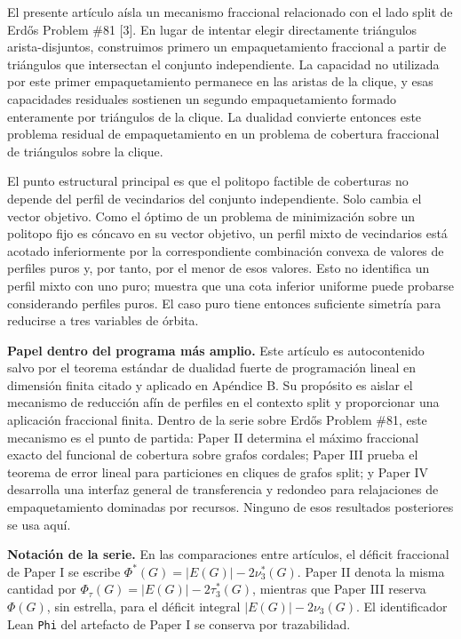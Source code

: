 \documentclass[
  spanish,
  11pt,
  a4paper,
]{article}
\begin{document}
El presente artículo aísla un mecanismo fraccional relacionado con el lado split de Erdős Problem \#81 {[}3{]}. En lugar de intentar elegir directamente triángulos arista-disjuntos, construimos primero un empaquetamiento fraccional a partir de triángulos que intersectan el conjunto independiente. La capacidad no utilizada por este primer empaquetamiento permanece en las aristas de la clique, y esas capacidades residuales sostienen un segundo empaquetamiento formado enteramente por triángulos de la clique. La dualidad convierte entonces este problema residual de empaquetamiento en un problema de cobertura fraccional de triángulos sobre la clique.

El punto estructural principal es que el politopo factible de coberturas no depende del perfil de vecindarios del conjunto independiente. Solo cambia el vector objetivo. Como el óptimo de un problema de minimización sobre un politopo fijo es cóncavo en su vector objetivo, un perfil mixto de vecindarios está acotado inferiormente por la correspondiente combinación convexa de valores de perfiles puros y, por tanto, por el menor de esos valores. Esto no identifica un perfil mixto con uno puro; muestra que una cota inferior uniforme puede probarse considerando perfiles puros. El caso puro tiene entonces suficiente simetría para reducirse a tres variables de órbita.

\textbf{Papel dentro del programa más amplio.} Este artículo es autocontenido salvo por el teorema estándar de dualidad fuerte de programación lineal en dimensión finita citado y aplicado en Apéndice B. Su propósito es aislar el mecanismo de reducción afín de perfiles en el contexto split y proporcionar una aplicación fraccional finita. Dentro de la serie sobre Erdős Problem \#81, este mecanismo es el punto de partida: Paper II determina el máximo fraccional exacto del funcional de cobertura sobre grafos cordales; Paper III prueba el teorema de error lineal para particiones en cliques de grafos split; y Paper IV desarrolla una interfaz general de transferencia y redondeo para relajaciones de empaquetamiento dominadas por recursos. Ninguno de esos resultados posteriores se usa aquí.

\textbf{Notación de la serie.} En las comparaciones entre artículos, el déficit fraccional de Paper I se escribe \(\Phi^*(G)=|E(G)|-2\nu_3^*(G)\). Paper II denota la misma cantidad por \(\Phi_\tau(G)=|E(G)|-2\tau_3^*(G)\), mientras que Paper III reserva \(\Phi(G)\), sin estrella, para el déficit integral \(|E(G)|-2\nu_3(G)\). El identificador Lean \texttt{Phi} del artefacto de Paper I se conserva por trazabilidad.
\end{document}
